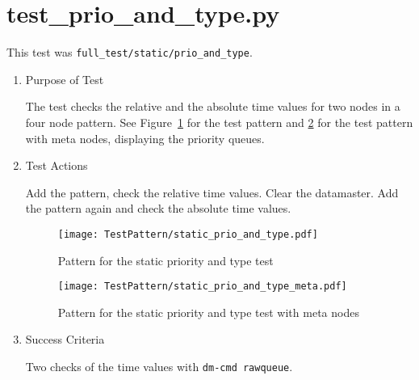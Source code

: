 \documentclass[12pt,a4paper]{report}
\begin{document}
\section{test\_prio\_and\_type.py}
This test was \texttt{full\_test/static/prio\_and\_type}.
\begin{enumerate}
  \item Purpose of Test

The test checks the relative and the absolute time values for two nodes
in a four node pattern.
See Figure~\ref{fig:Pattern_for_the_static_priority_and_type_test} for
the test pattern and
\ref{fig:Pattern_for_the_static_priority_and_type_test_with_meta_nodes}
for the test pattern with meta nodes,
displaying the priority queues.
  \item Test Actions

  Add the pattern, check the relative time values. Clear the datamaster.
  Add the pattern again and check the absolute time values.
    \begin{figure}
        \centering
        \texttt{[image: TestPattern/static\_prio\_and\_type.pdf]}
        \caption{Pattern for the static priority and type test}
        \label{fig:Pattern_for_the_static_priority_and_type_test}
    \end{figure}
    \begin{figure}
        \centering
        \texttt{[image: TestPattern/static\_prio\_and\_type\_meta.pdf]}
        \caption{Pattern for the static priority and type test with meta nodes}
        \label{fig:Pattern_for_the_static_priority_and_type_test_with_meta_nodes}
    \end{figure}
  \item Success Criteria

  Two checks of the time values with \texttt{dm-cmd rawqueue}.
\end{enumerate}
\end{document}
